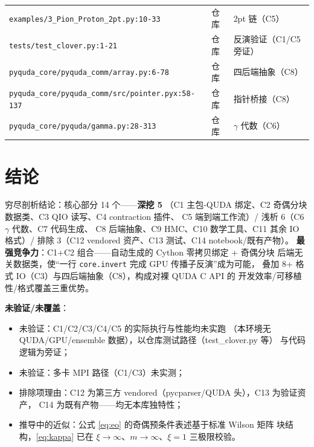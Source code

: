 \documentclass[UTF8]{ctexart}
\begin{document}
\begin{xltabular}{\textwidth}{llX}
\texttt{\nolinkurl{examples/3_Pion_Proton_2pt.py:10-33}} & 仓库 & 2pt 链（C5） \\
\texttt{\nolinkurl{tests/test_clover.py:1-21}} & 仓库 & 反演验证（C1/C5 旁证） \\
\texttt{\nolinkurl{pyquda_core/pyquda_comm/array.py:6-78}} & 仓库 & 四后端抽象（C8） \\
\texttt{\nolinkurl{pyquda_core/pyquda_comm/src/pointer.pyx:58-137}} & 仓库 & 指针桥接（C8） \\
\texttt{\nolinkurl{pyquda_core/pyquda/gamma.py:28-313}} & 仓库 & $\gamma$ 代数（C6） \\
\bottomrule
\end{xltabular}

\section{结论}
\begin{conclbox}
穷尽剖析结论：核心部分 14 个——\textcolor{algo}{\textbf{深挖 5}}
（C1 主包-QUDA 绑定、C2 奇偶分块数据类、C3 QIO 读写、C4 contraction 插件、
C5 端到端工作流）/ \textcolor{phys}{浅析 6}（C6 $\gamma$ 代数、C7 代码生成、
C8 后端抽象、C9 HMC、C10 数学工具、C11 其余 IO 格式）/
\textcolor{warn}{排除 3}（C12 vendored 资产、C13 测试、C14 notebook/既有产物）。
\textbf{最强竞争力}：C1+C2 组合——自动生成的 Cython 零拷贝绑定 + 奇偶分块
后端无关数据类，使“一行 \texttt{core.invert} 完成 GPU 传播子反演”成为可能，
叠加 8+ 格式 IO（C3）与四后端抽象（C8），构成对裸 QUDA C API 的
开发效率/可移植性/格式覆盖三重优势。
\end{conclbox}
\begin{warnbox}
\textbf{未验证/未覆盖}：
\begin{itemize}
  \item \textcolor{warn}{未验证}：C1/C2/C3/C4/C5 的实际执行与性能均未实跑
        （本环境无 QUDA/GPU/ensemble 数据），以仓库测试路径（test\_clover.py 等）
        与代码逻辑为旁证；
  \item \textcolor{warn}{未验证}：多卡 MPI 路径（C1/C3）未实测；
  \item 排除项理由：C12 为第三方 vendored（pycparser/QUDA 头），C13 为验证资产，
        C14 为既有产物——均无本库独特性；
  \item 推导中的近似：公式 \eqref{eq:eo} 的奇偶预条件表述基于标准 Wilson 矩阵
        块结构，\eqref{eq:kappa} 已在 $\xi\to\infty$、$m\to\infty$、$\xi=1$ 三极限校验。
\end{itemize}
\end{warnbox}
\end{document}
